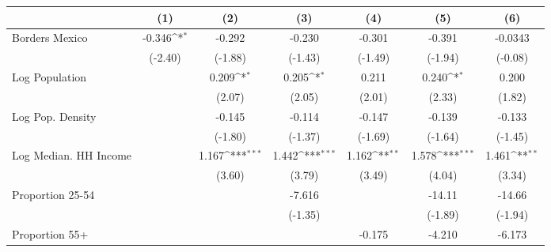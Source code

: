 {
\def\sym#1{\ifmmode^{#1}\else\(^{#1}\)\fi}
\begin{tabular}{l*{6}{c}}
\toprule
                    &\multicolumn{1}{c}{(1)}         &\multicolumn{1}{c}{(2)}         &\multicolumn{1}{c}{(3)}         &\multicolumn{1}{c}{(4)}         &\multicolumn{1}{c}{(5)}         &\multicolumn{1}{c}{(6)}         \\
\midrule
Borders Mexico      &      -0.346\sym{*}  &      -0.292         &      -0.230         &      -0.301         &      -0.391         &     -0.0343         \\
                    &     (-2.40)         &     (-1.88)         &     (-1.43)         &     (-1.49)         &     (-1.94)         &     (-0.08)         \\
\addlinespace
Log Population      &                     &       0.209\sym{*}  &       0.205\sym{*}  &       0.211         &       0.240\sym{*}  &       0.200         \\
                    &                     &      (2.07)         &      (2.05)         &      (2.01)         &      (2.33)         &      (1.82)         \\
\addlinespace
Log Pop. Density    &                     &      -0.145         &      -0.114         &      -0.147         &      -0.139         &      -0.133         \\
                    &                     &     (-1.80)         &     (-1.37)         &     (-1.69)         &     (-1.64)         &     (-1.45)         \\
\addlinespace
Log Median. HH Income&                     &       1.167\sym{***}&       1.442\sym{***}&       1.162\sym{**} &       1.578\sym{***}&       1.461\sym{**} \\
                    &                     &      (3.60)         &      (3.79)         &      (3.49)         &      (4.04)         &      (3.34)         \\
\addlinespace
Proportion 25-54    &                     &                     &      -7.616         &                     &      -14.11         &      -14.66         \\
                    &                     &                     &     (-1.35)         &                     &     (-1.89)         &     (-1.94)         \\
\addlinespace
Proportion 55+      &                     &                     &                     &      -0.175         &      -4.210         &      -6.173         \\

\end{tabular}}
